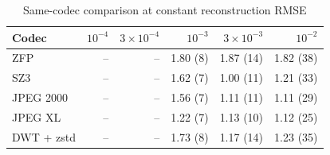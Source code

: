 \begin{table}[t]
\centering
\caption{Same-codec comparison at constant reconstruction RMSE}
\label{tab:fixed_codec}
\footnotesize
\setlength{\tabcolsep}{3pt}
\begin{tabular}{lrrrrr}
\toprule
Codec & $10^{-4}$ & $3\times10^{-4}$ & $10^{-3}$ & $3\times10^{-3}$ & $10^{-2}$ \\
\midrule
ZFP & -- & -- & 1.80 (8) & 1.87 (14) & 1.82 (38) \\
SZ3 & -- & -- & 1.62 (7) & 1.00 (11) & 1.21 (33) \\
JPEG 2000 & -- & -- & 1.56 (7) & 1.11 (11) & 1.11 (29) \\
JPEG XL & -- & -- & 1.22 (7) & 1.13 (10) & 1.12 (25) \\
DWT + zstd & -- & -- & 1.73 (8) & 1.17 (14) & 1.23 (35) \\
\bottomrule
\end{tabular}
\end{table}
